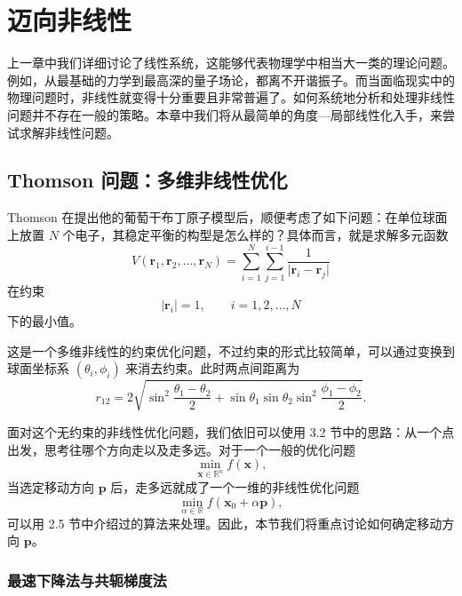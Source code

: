 \chapter{迈向非线性}

上一章中我们详细讨论了线性系统，这能够代表物理学中相当大一类的理论问题。例如，从最基础的力学到最高深的量子场论，都离不开谐振子。而当面临现实中的物理问题时，非线性就变得十分重要且非常普遍了。如何系统地分析和处理非线性问题并不存在一般的策略。本章中我们将从最简单的角度---局部线性化入手，来尝试求解非线性问题。

\section{Thomson 问题：多维非线性优化}

Thomson 在提出他的葡萄干布丁原子模型后，顺便考虑了如下问题：在单位球面上放置 $N$ 个电子，其稳定平衡的构型是怎么样的？具体而言，就是求解多元函数
\begin{equation}
V(\bm r_1,\bm r_2,\ldots,\bm r_N)
=\sum_{i=1}^{N}\sum_{j=1}^{i-1}\frac{1}{\lvert\bm r_i-\bm r_j\rvert}
\tag{4.1.1}
\end{equation}
在约束
\begin{equation}
\lvert\bm r_i\rvert=1,\qquad i=1,2,\ldots,N
\tag{4.1.2}
\end{equation}
下的最小值。

这是一个多维非线性的约束优化问题，不过约束的形式比较简单，可以通过变换到球面坐标系 $(\theta_i,\phi_i)$ 来消去约束。此时两点间距离为
\begin{equation}
r_{12}=2\sqrt{\sin^2\frac{\theta_1-\theta_2}{2}
+\sin\theta_1\sin\theta_2\sin^2\frac{\phi_1-\phi_2}{2}}.
\tag{4.1.3}
\end{equation}

面对这个无约束的非线性优化问题，我们依旧可以使用 3.2 节中的思路：从一个点出发，思考往哪个方向走以及走多远。对于一个一般的优化问题
\begin{equation}
\min_{\bm x\in\mathbb R^n} f(\bm x),
\tag{4.1.4}
\end{equation}
当选定移动方向 $\bm p$ 后，走多远就成了一个一维的非线性优化问题
\begin{equation}
\min_{\alpha\in\mathbb R} f(\bm x_0+\alpha\bm p),
\tag{4.1.5}
\end{equation}
可以用 2.5 节中介绍过的算法来处理。因此，本节我们将重点讨论如何确定移动方向 $\bm p$。

\subsection{最速下降法与共轭梯度法}

